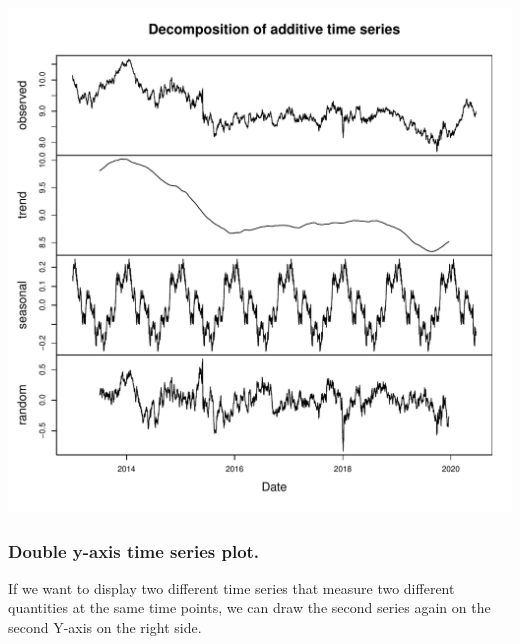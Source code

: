 \documentclass{article}\usepackage[]{graphicx}\usepackage[]{xcolor}
\makeatletter
\def\maxwidth{ %
  \ifdim\Gin@nat@width>\linewidth
    \linewidth
  \else
    \Gin@nat@width
  \fi
}
\newenvironment{knitrout}{}{} %
\makeatother
\begin{document}
\begin{knitrout}
\color{fgcolor}
\includegraphics[width=\maxwidth]{figure/unnamed-chunk-3-1} 
\end{knitrout}



\subsubsection{Double y-axis time series plot.}

If we want to display two different time series that measure two different quantities at the same time points, we can draw the second series again on the second Y-axis on the right side.
\end{document}
